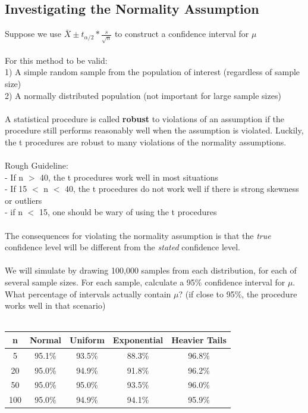 \documentclass[12pt, a4paper]{article}
\begin{document}
	\subsection{Investigating the Normality Assumption}
	Suppose we use $\bar{X} \pm t_{\alpha/2}*\frac{s}{\sqrt{n}}$ to construct a confidence interval for $\mu$ \\~\\
	For this method to be valid: \\
	1) A simple random sample from the population of interest (regardless of sample size) \\
	2) A normally distributed population (not important for large sample sizes) \\~\\
	A statistical procedure is called \textbf{robust} to violations of an assumption if the procedure still performs reasonably well when the assumption is violated. Luckily, the t procedures are robust to many violations of the normality assumptions. \\~\\
	Rough Guideline: \\
	- If n $>$ 40, the t procedures work well in most situations \\
	- If 15 $<$ n $<$ 40, the t procedures do not work well if there is strong skewness or outliers \\
	- if n $<$ 15, one should be wary of using the t procedures \\~\\
	The consequences for violating the normality assumption is that the \textit{true} confidence level will be different from the \textit{stated} confidence level. \\~\\
	We will simulate by drawing 100,000 samples from each distribution, for each of several sample sizes. For each sample, calculate a 95\% confidence interval for $\mu$. What percentage of intervals actually contain $\mu$? (if close to 95\%, the procedure works well in that scenario) \\~\\
	\begin{tabular}{ |c|c|c|c|c| }
		\hline
		n & Normal & Uniform & Exponential & Heavier Tails \\ \hline
		5 & 95.1\% & 93.5\% & 88.3\% & 96.8\% \\
		20 & 95.0\% & 94.9\% &  91.8\% & 96.2\% \\
		50 & 95.0\% & 95.0\% & 93.5\% & 96.0\% \\
		100 & 95.0\% & 94.9\% & 94.1\% & 95.9\% \\
		\hline
	\end{tabular} \\~\\
\end{document}

